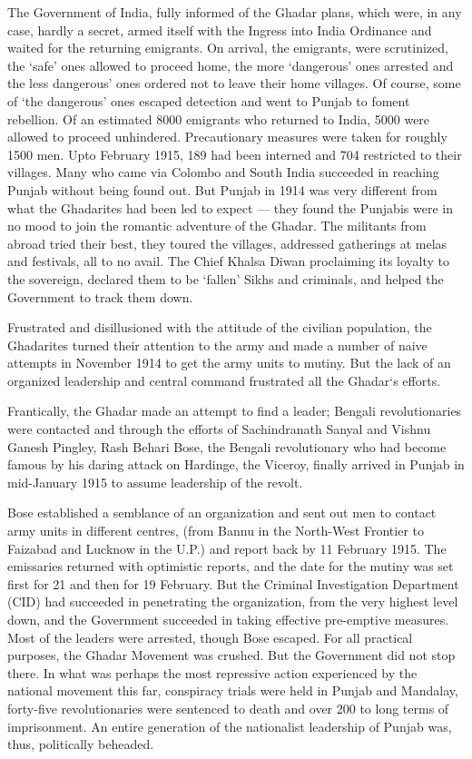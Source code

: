 The Government of India, fully informed of the Ghadar plans, which were, in any case, hardly a secret, armed itself with the Ingress into India Ordinance and waited for the returning emigrants. On arrival, the emigrants, were scrutinized, the ‘safe’ ones allowed to proceed home, the more ‘dangerous’ ones arrested and the less dangerous’ ones ordered not to leave their home villages. Of course, some of ‘the dangerous’ ones escaped detection and went to Punjab to foment rebellion. Of an estimated 8000 emigrants who returned to India, 5000 were allowed to proceed unhindered. Precautionary measures were taken for roughly 1500 men. Upto February 1915, 189 had been interned and 704 restricted to their villages. Many who came via Colombo and South India succeeded in reaching Punjab without being found out. But Punjab in 1914 was very different from what the Ghadarites had been led to expect — they found the Punjabis were in no mood to join the romantic adventure of the Ghadar. The militants from abroad tried their best, they toured the villages, addressed gatherings at melas and festivals, all to no avail. The Chief Khalsa Diwan proclaiming its loyalty to the sovereign, declared them to be ‘fallen’ Sikhs and criminals, and helped the Government to track them down.

Frustrated and disillusioned with the attitude of the civilian population, the Ghadarites turned their attention to the army and made a number of naive attempts in November 1914 to get the army units to mutiny. But the lack of an organized leadership and central command frustrated all the Ghadar‘s efforts.

Frantically, the Ghadar made an attempt to find a leader; Bengali revolutionaries were contacted and through the efforts of Sachindranath Sanyal and Vishnu Ganesh Pingley, Rash Behari Bose, the Bengali revolutionary who had become famous by his daring attack on Hardinge, the Viceroy, finally arrived in Punjab in mid-January 1915 to assume leadership of the revolt.

Bose established a semblance of an organization and sent out men to contact army units in different centres, (from Bannu in the North-West Frontier to Faizabad and Lucknow in the U.P.) and report back by 11 February 1915. The emissaries returned with optimistic reports, and the date for the mutiny was set first for 21 and then for 19 February. But the Criminal Investigation Department (CID) had succeeded in penetrating the organization, from the very highest level down, and the Government succeeded in taking effective pre-emptive measures. Most of the leaders were arrested, though Bose escaped. For all practical purposes, the Ghadar Movement was crushed. But the Government did not stop there. In what was perhaps the most repressive action experienced by the national movement this far, conspiracy trials were held in Punjab and Mandalay, forty-five revolutionaries were sentenced to death and over 200 to long terms of imprisonment. An entire generation of the nationalist leadership of Punjab was, thus, politically beheaded.

